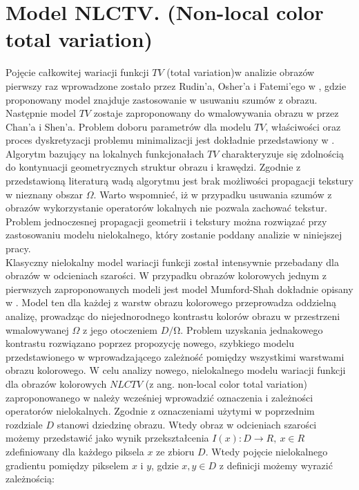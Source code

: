 \documentclass[12pt, twoside, openany]{report}
\theoremstyle{definition}
\begin{document}
\section{Model NLCTV. (Non-local color total variation)}
Pojęcie całkowitej wariacji funkcji $TV$ (total variation)w analizie obrazów pierwszy raz wprowadzone zostało przez Rudin'a, Osher'a i Fatemi’ego w \cite{rudin1992nonlinear}, gdzie proponowany model znajduje zastosowanie w usuwaniu szumów z obrazu. Następnie model $TV$ zostaje zaproponowany do wmalowywania obrazu w \cite{MathematicalModelsforNLTextureInpainting} przez Chan'a i Shen’a. Problem doboru parametrów dla modelu $TV$, właściwości oraz proces dyskretyzacji problemu minimalizacji jest dokładnie przedstawiony w \cite{getreuer2012total}. Algorytm bazujący na lokalnych funkcjonałach $TV$  charakteryzuje się zdolnością do kontynuacji geometrycznych struktur obrazu i krawędzi. Zgodnie z przedstawioną literaturą wadą algorytmu jest brak możliwości propagacji tekstury w nieznany obszar $\Omega$. Warto wspomnieć, iż w przypadku usuwania szumów z obrazów wykorzystanie operatorów lokalnych nie pozwala zachować tekstur. Problem jednoczesnej propagacji geometrii i tekstury można rozwiązać przy zastosowaniu modelu nielokalnego, który zostanie poddany analizie w niniejszej pracy. \\
Klasyczny nielokalny model wariacji funkcji został intensywnie przebadany dla obrazów w odcieniach szarości. W przypadku obrazów kolorowych jednym z pierwszych zaproponowanych modeli jest model Mumford-Shah dokładnie opisany w \cite{jung2011nonlocal}. Model ten dla każdej z warstw obrazu kolorowego przeprowadza oddzielną analizę, prowadząc do niejednorodnego kontrastu kolorów obrazu w przestrzeni wmalowywanej $\Omega$ z jego otoczeniem $D/\mathrm{\Omega}$. Problem uzyskania jednakowego kontrastu rozwiązano poprzez propozycję nowego, szybkiego modelu przedstawionego w \cite{duan2015fast} wprowadzającego zależność pomiędzy wszystkimi warstwami obrazu kolorowego. W celu analizy nowego, nielokalnego modelu wariacji funkcji dla obrazów kolorowych $NLCTV$ (z ang. non-local color total variation) zaproponowanego w \cite{duan2015fast} należy wcześniej wprowadzić oznaczenia i zależności operatorów nielokalnych. 
Zgodnie z oznaczeniami użytymi w poprzednim rozdziale $D$ stanowi dziedzinę obrazu. Wtedy obraz w odcieniach szarości możemy przedstawić jako wynik przekształcenia $I\left(x\right):D\longrightarrow R,\ x\in R$ zdefiniowany dla każdego piksela $x$ ze zbioru $D$. Wtedy pojęcie nielokalnego gradientu pomiędzy pikselem $x$ i $y$, gdzie $x,y\in D$ z definicji możemy wyrazić zależnością:
\end{document}
